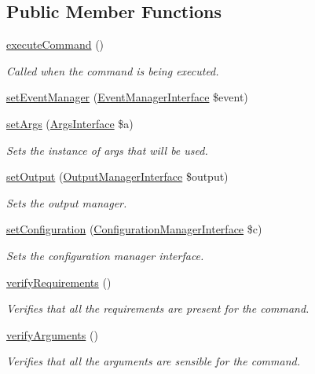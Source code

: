 \subsection*{Public Member Functions}
\begin{DoxyCompactItemize}
\item 
\hyperlink{classHelpCommand_aad2fb7f9e78677d181a6b000fd9ff979}{execute\-Command} ()
\begin{DoxyCompactList}\small\item\em Called when the command is being executed. \end{DoxyCompactList}\item 
\hyperlink{classGenericCommand_acba0758cce439b8aeaff359578ba5d1d}{set\-Event\-Manager} (\hyperlink{interfaceEventManagerInterface}{Event\-Manager\-Interface} \$event)
\item 
\hyperlink{classGenericCommand_ab918b084bc099cb5f8f56db2d6ed4cac}{set\-Args} (\hyperlink{interfaceArgsInterface}{Args\-Interface} \$a)
\begin{DoxyCompactList}\small\item\em Sets the instance of args that will be used. \end{DoxyCompactList}\item 
\hyperlink{classGenericCommand_aee43238a646b83c341ccb27b7d8e0978}{set\-Output} (\hyperlink{interfaceOutputManagerInterface}{Output\-Manager\-Interface} \$output)
\begin{DoxyCompactList}\small\item\em Sets the output manager. \end{DoxyCompactList}\item 
\hyperlink{classGenericCommand_a3677ddac20e11f61766c56820f74555b}{set\-Configuration} (\hyperlink{interfaceConfigurationManagerInterface}{Configuration\-Manager\-Interface} \$c)
\begin{DoxyCompactList}\small\item\em Sets the configuration manager interface. \end{DoxyCompactList}\item 
\hyperlink{classGenericCommand_ab0ce20912e21033169d016310946ccf6}{verify\-Requirements} ()
\begin{DoxyCompactList}\small\item\em Verifies that all the requirements are present for the command. \end{DoxyCompactList}\item 
\hyperlink{classGenericCommand_a3ceec8b56361aeb4b09bee46bb85bac4}{verify\-Arguments} ()
\begin{DoxyCompactList}\small\item\em Verifies that all the arguments are sensible for the command. \end{DoxyCompactList}\end{DoxyCompactItemize}
